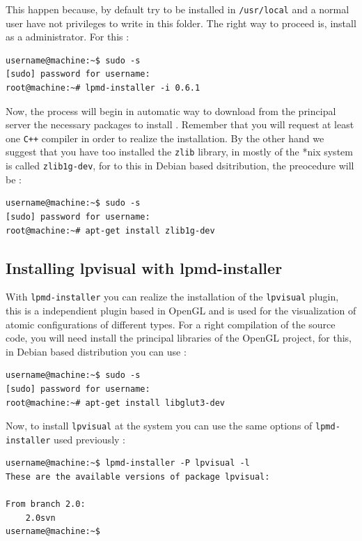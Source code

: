 This happen because, {\lpmd} by default try to be installed in
\verb|/usr/local| and a normal user have not privileges to write in this
folder. The right way to proceed is, install as a administrator. For this :

\begin{verbatim}
username@machine:~$ sudo -s
[sudo] password for username: 
root@machine:~# lpmd-installer -i 0.6.1
\end{verbatim}

Now, the process will begin in automatic way to download from the principal
server the necessary packages to install {\lpmd}. Remember that you will
request at least one \verb|C++| compiler in order to realize the installation.
By the other hand we suggest that you have too installed the \verb|zlib|
library, in mostly of the *nix system is called \verb|zlib1g-dev|, for to this
in Debian based dsitribution, the preocedure will be :

\begin{verbatim}
username@machine:~$ sudo -s
[sudo] password for username: 
root@machine:~# apt-get install zlib1g-dev
\end{verbatim}


\subsection{Installing lpvisual with lpmd-installer}

With \verb|lpmd-installer| you can realize the installation of the
\verb|lpvisual| plugin, this is a independient plugin based in OpenGL and is
used for the visualization of atomic configurations of different types. For a
right compilation of the source code, you will need install the principal
libraries of the OpenGL project, for this, in Debian based distribution you can
use :

\begin{verbatim}
username@machine:~$ sudo -s
[sudo] password for username: 
root@machine:~# apt-get install libglut3-dev
\end{verbatim}

Now, to install \verb|lpvisual| at the system you can use the same options of
\verb|lpmd-installer| used previously :

\begin{verbatim}
username@machine:~$ lpmd-installer -P lpvisual -l
These are the available versions of package lpvisual:

From branch 2.0: 
    2.0svn
username@machine:~$  
\end{verbatim}

